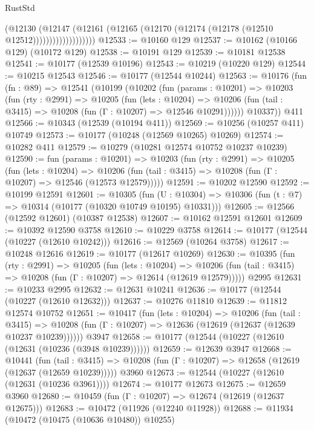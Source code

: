 \begin{lexlean}{RustStd}
\begin{coremodule}
                          (@12130
                            (@12147
                              (@12161
                                (@12165 (@12170 (@12174 (@12178 (@12510 @12512)))))))))))))))))))
@12533 := @10160 @129
@12537 := @10162 (@10166 @129) (@10172 @129)
@12538 := @10191 @129
@12539 := @10181 @12538
@12541 := @10177 (@12539 @10196)
@12543 := @10219 (@10220 @129)
@12544 := @10215 @12543
@12546 := @10177 (@12544 @10244)
@12563 := @10176
    (fun (fn : @89) =>
    @12541
      (@10199
        (@10202
          (fun (params : @10201) =>
          @10203
            (fun (rty : @2991) =>
            @10205
              (fun (lets : @10204) =>
              @10206 (fun (tail : @3415) => @10208 (fun (Γ : @10207) => @12546 @10291))))))
        @10337))
    @411
@12566 := @10343 (@12539 (@10194 @411))
@12569 := @10256 (@10257 @411) @10749
@12573 := @10177 (@10248 (@12569 @10265) @10269)
@12574 := @10282 @411
@12579 := @10279 (@10281 @12574 @10752 @10237 @10239)
@12590 := fun (params : @10201) =>
  @10203
    (fun (rty : @2991) =>
    @10205
      (fun (lets : @10204) =>
      @10206 (fun (tail : @3415) => @10208 (fun (Γ : @10207) => @12546 (@12573 @12579)))))
@12591 := @10202 @12590
@12592 := @10199 @12591
@12601 := @10305
    (fun (U : @10304) => @10306 (fun (t : @7) => @10314 (@10177 (@10320 @10749 @10195) @10331)))
@12605 := @12566 (@12592 @12601) (@10387 @12538)
@12607 := @10162 @12591 @12601
@12609 := @10392 @12590 @3758
@12610 := @10229 @3758
@12614 := @10177 (@12544 (@10227 (@12610 @10242)))
@12616 := @12569 (@10264 @3758)
@12617 := @10248 @12616
@12619 := @10177 (@12617 @10269)
@12630 := @10395
    (fun (rty : @2991) =>
    @10205
      (fun (lets : @10204) =>
      @10206 (fun (tail : @3415) => @10208 (fun (Γ : @10207) => @12614 (@12619 @12579)))))
    @2995
@12631 := @10233 @2995
@12632 := @12631 @10241
@12636 := @10177 (@12544 (@10227 (@12610 @12632)))
@12637 := @10276 @11810
@12639 := @11812 @12574 @10752
@12651 := @10417
    (fun (lets : @10204) =>
    @10206
      (fun (tail : @3415) =>
      @10208 (fun (Γ : @10207) => @12636 (@12619 (@12637 (@12639 @10237 @10239))))))
    @3947
@12658 := @10177 (@12544 (@10227 (@12610 (@12631 (@10236 (@3948 @10239))))))
@12659 := @12639 @3947
@12668 := @10441
    (fun (tail : @3415) => @10208 (fun (Γ : @10207) => @12658 (@12619 (@12637 (@12659 @10239)))))
    @3960
@12673 := @12544 (@10227 (@12610 (@12631 (@10236 @3961))))
@12674 := @10177 @12673
@12675 := @12659 @3960
@12680 := @10459 (fun (Γ : @10207) => @12674 (@12619 (@12637 @12675)))
@12683 := @10472 (@11926 (@12240 @11928))
@12688 := @11934 (@10472 (@10475 (@10636 @10480)) @10255)

\end{coremodule}
\end{lexlean}
